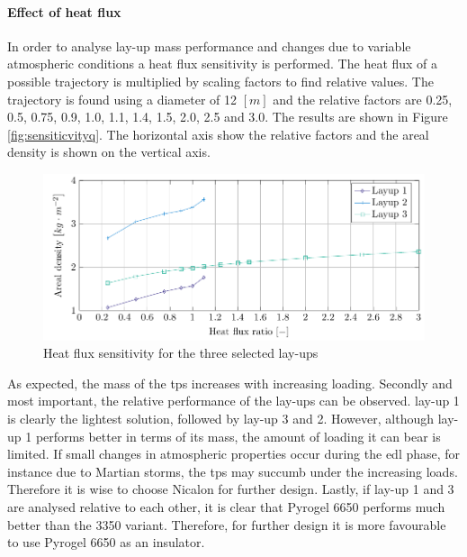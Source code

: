 \paragraph{Effect of heat flux}
In order to analyse lay-up mass performance and changes due to variable atmospheric conditions a heat flux sensitivity is performed. The heat flux of a possible trajectory is multiplied by scaling factors to find relative values. The trajectory is found using a diameter of 12 $ \left[ m \right]$ and the relative factors are 0.25, 0.5, 0.75, 0.9, 1.0, 1.1, 1.4, 1.5, 2.0, 2.5 and 3.0. The results are shown in Figure \ref{fig:sensiticvityq}. The horizontal axis show the relative factors and the areal density is shown on the vertical axis. 

\begin{figure}[h]
	\centering
	\includegraphics{./Figure/Thermal/Sensitivityq.pdf}
	\caption{Heat flux sensitivity for the three selected lay-ups}
	\label{fig:sensitivityq}
\end{figure}


As expected, the mass of the \gls{tps} increases with increasing loading. Secondly and most important, the relative performance of the lay-ups can be observed. lay-up 1 is clearly the lightest solution, followed by lay-up 3 and 2. However, although lay-up 1 performs better in terms of its mass, the amount of loading it can bear is limited. If small changes in atmospheric properties occur during the \gls{edl} phase, for instance due to Martian storms, the \gls{tps} may succumb under the increasing loads. Therefore it is wise to choose Nicalon for further design. Lastly, if lay-up 1 and 3 are analysed relative to each other, it is clear that Pyrogel 6650 performs much better than the 3350 variant. Therefore, for further design it is more favourable to use Pyrogel 6650 as an insulator.

